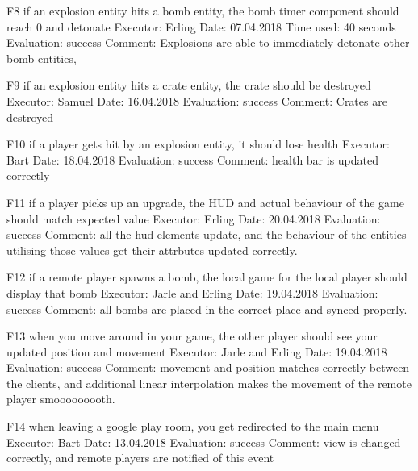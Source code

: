 F8 if an explosion entity hits a bomb entity, the bomb timer component should reach 0 and detonate
Executor: Erling
Date: 07.04.2018
Time used: 40 seconds
Evaluation: success
Comment: Explosions are able to immediately detonate other bomb entities,

F9 if an explosion entity hits a crate entity, the crate should be destroyed
Executor: Samuel
Date: 16.04.2018
Evaluation: success
Comment: Crates are destroyed

F10 if a player gets hit by an explosion entity, it should lose health
Executor: Bart
Date: 18.04.2018
Evaluation: success
Comment: health bar is updated correctly

F11 if a player picks up an upgrade, the HUD and actual behaviour of the game should match expected value
Executor: Erling
Date: 20.04.2018
Evaluation: success
Comment: all the hud elements update, and the behaviour of the entities utilising those values get their attrbutes updated correctly.

F12 if a remote player spawns a bomb, the local game for the local player should display that bomb
Executor: Jarle and Erling
Date: 19.04.2018
Evaluation: success
Comment: all bombs are placed in the correct place and synced properly.

F13 when you move around in your game, the other player should see your updated position and movement
Executor: Jarle and Erling
Date: 19.04.2018
Evaluation: success
Comment: movement and position matches correctly between the clients, and additional linear interpolation makes the movement of the remote player smooooooooth.

F14 when leaving a google play room, you get redirected to the main menu
Executor: Bart
Date: 13.04.2018
Evaluation: success
Comment: view is changed correctly, and remote players are notified of this event
